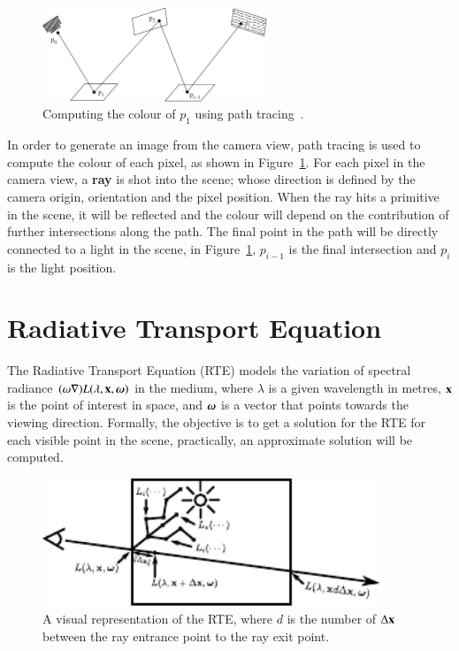 \begin{figure}[htbp!]
	\centering
	\includegraphics[width=0.6\textwidth]{img/path_tracing}
	\caption{Computing the colour of $p_1$ using path tracing~\cite{Pharr:2010}.}
	\label{fig:path_tracing}
\end{figure}

In order to generate an image from the camera view, path tracing is used to compute the colour of each pixel, as shown in Figure~\ref{fig:path_tracing}.
For each pixel in the camera view, a \textbf{ray} is shot into the scene; whose direction is defined by the camera origin, orientation and the pixel position.
When the ray hits a primitive in the scene, it will be reflected and the colour will depend on the contribution of further intersections along the path.
The final point in the path will be directly connected to a light in the scene, in Figure~\ref{fig:path_tracing}, $p_{i - 1}$ is the final intersection and $p_i$ is the light position.

\section{Radiative Transport Equation}
\label{sec:radiative_transport_equation}

The Radiative Transport Equation (RTE) \cite{Howell:2002} models the variation of spectral radiance $(\omega \nabla) L(\lambda, \mathbf{x}, \boldsymbol{\omega})$ in the medium, where $\lambda$ is a given wavelength in metres, $\mathbf{x}$ is the point of interest in space, and $\boldsymbol{\omega}$ is a vector that points towards the viewing direction.
Formally, the objective is to get a solution for the RTE for each visible point in the scene, practically, an approximate solution will be computed.

\begin{figure}[htbp!]
	\centering
	\includegraphics[width=0.9\textwidth]{img/ray_marching_parti}
	\caption{A visual representation of the RTE, where $d$ is the number of $\Delta \mathbf{x}$ between the ray entrance point to the ray exit point.}
	\label{fig:ray_marching_parti}
\end{figure}

